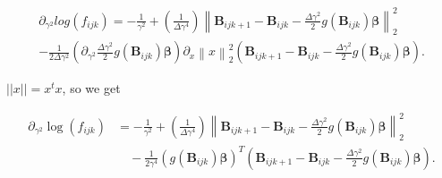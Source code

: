 \begin{align*}
\partial_{\gamma^2} log(f_{ijk})  = -\frac{1}{\gamma^2} +( \frac{1}{\Delta \gamma^4})\left\lVert \textbf{B}_{ijk+1} - \textbf{B}_{ijk} - \frac{\Delta\gamma^2}{2} g(\textbf{B}_{ijk})\bm \beta \right\rVert_2^2 \\ -  \frac{1}{2\Delta \gamma^2} (\partial_{\gamma^2} \frac{\Delta\gamma^2}{2} g(\textbf{B}_{ijk})\bm \beta) \partial_x \left\lVert x\right\rVert_2^2 (\textbf{B}_{ijk+1} - \textbf{B}_{ijk} - \frac{\Delta\gamma^2}{2} g(\textbf{B}_{ijk})\bm \beta ).
\end{align*}


$||x|| = x^tx$, so we get

\begin{align*}
\partial_{\gamma^2} \log(f_{ijk}) 
&= -\frac{1}{\gamma^2} 
+ \left( \frac{1}{\Delta \gamma^4} \right)
\left\lVert 
\textbf{B}_{ijk+1} - \textbf{B}_{ijk} 
- \frac{\Delta \gamma^2}{2} g(\textbf{B}_{ijk}) \bm{\beta}
\right\rVert_2^2 \\
&\quad - \frac{1}{2\gamma^4} 
\left( g(\textbf{B}_{ijk}) \bm{\beta} \right)^T 
\left( \textbf{B}_{ijk+1} - \textbf{B}_{ijk} 
- \frac{\Delta \gamma^2}{2} g(\textbf{B}_{ijk}) \bm{\beta} \right).
\end{align*}


